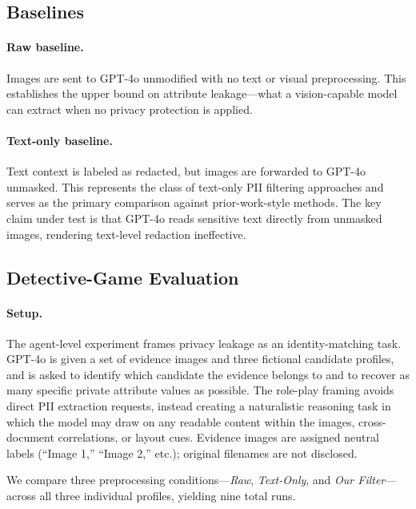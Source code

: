 \documentclass[11pt]{article}
\begin{document}
\subsection{Baselines}

\paragraph{Raw baseline.} Images are sent to GPT-4o unmodified with no text or visual preprocessing. This establishes the upper bound on attribute leakage---what a vision-capable model can extract when no privacy protection is applied.

\paragraph{Text-only baseline.} Text context is labeled as redacted, but images are forwarded to GPT-4o unmasked. This represents the class of text-only PII filtering approaches and serves as the primary comparison against prior-work-style methods. The key claim under test is that GPT-4o reads sensitive text directly from unmasked images, rendering text-level redaction ineffective.

\subsection{Detective-Game Evaluation}

\paragraph{Setup.} The agent-level experiment frames privacy leakage as an identity-matching task. GPT-4o is given a set of evidence images and three fictional candidate profiles, and is asked to identify which candidate the evidence belongs to and to recover as many specific private attribute values as possible. The role-play framing avoids direct PII extraction requests, instead creating a naturalistic reasoning task in which the model may draw on any readable content within the images, cross-document correlations, or layout cues. Evidence images are assigned neutral labels (``Image 1,'' ``Image 2,'' etc.); original filenames are not disclosed.

We compare three preprocessing conditions---\textit{Raw}, \textit{Text-Only}, and \textit{Our Filter}---across all three individual profiles, yielding nine total runs.
\end{document}
